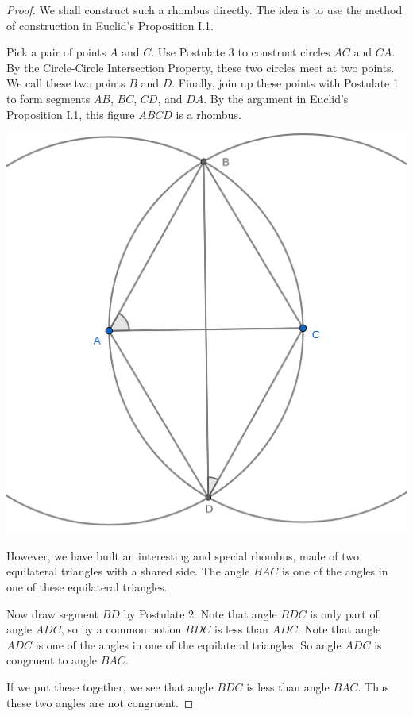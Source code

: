 \documentclass{tufte-handout}
\theoremstyle{definition}
\begin{document}
\begin{proof}
We shall construct such a rhombus directly. The idea is to use the method of construction in Euclid's Proposition I.1.

Pick a pair of points $A$ and $C$. Use Postulate 3 to construct circles $AC$ and $CA$. By the Circle-Circle Intersection Property, these two circles meet at two points. We call these two points $B$ and $D$. Finally, join up these points with Postulate 1 to form segments $AB$, $BC$, $CD$, and $DA$. By the argument in Euclid's Proposition I.1, this figure $ABCD$ is a rhombus.

\begin{marginfigure}
  \includegraphics{images/double_equilateral.png}
\end{marginfigure}

However, we have built an interesting and special rhombus, made of two equilateral triangles with a shared side. The angle $BAC$ is one of the angles in one of these equilateral triangles.

Now draw segment $BD$ by Postulate 2. Note that angle $BDC$ is only part of angle $ADC$, so by a common notion $BDC$ is less than $ADC$. Note that angle $ADC$ is one of the angles in one of the equilateral triangles. So angle $ADC$ is congruent to angle $BAC$.

If we put these together, we see that angle $BDC$ is less than angle $BAC$. Thus these two angles are not congruent.
\end{proof}
\end{document}
